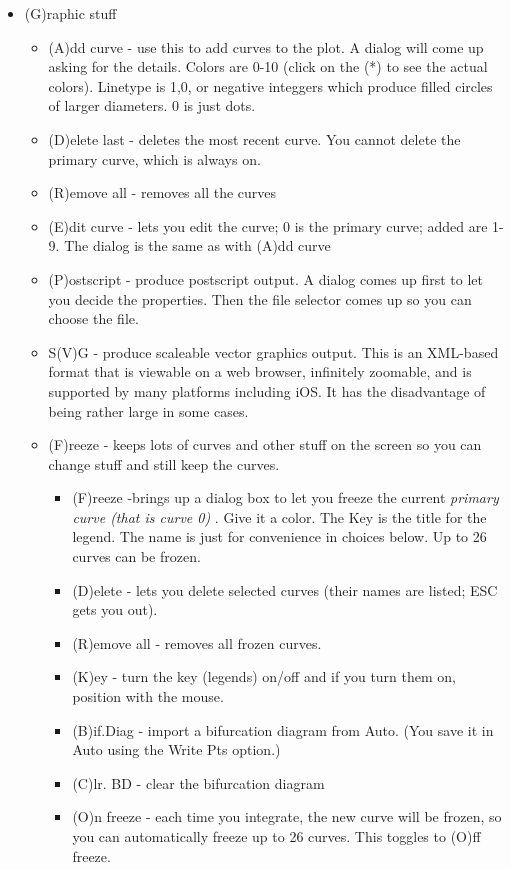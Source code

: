 \documentclass{article}
\begin{document}
\begin{itemize}
\begin{itemize}
\end{itemize}
\item (G)raphic stuff 
\begin{itemize}
\item (A)dd curve - use this to add curves to the plot. A dialog will come up asking for the details. Colors are 0-10 (click on the (*) to see the actual colors). Linetype is 1,0, or negative integgers which produce filled circles of larger diameters. 0 is just dots.
\item (D)elete last - deletes the most recent curve. You cannot delete the primary curve, which is always on.
\item (R)emove all - removes all the curves
\item (E)dit curve - lets you edit the curve; 0 is the primary curve; added are 1-9.  The dialog is the same as with (A)dd curve
\item (P)ostscript - produce postscript output. A dialog comes up first to let you decide the properties. Then the file selector comes up so you can choose the file. 
\item S(V)G - produce scaleable vector graphics output. This is an XML-based format that is viewable on a web browser, infinitely zoomable, and is supported by many platforms including iOS. It has the disadvantage of being rather large in some cases.
\item (F)reeze - keeps lots of curves and other stuff on the screen so you can change stuff and still keep the curves.
\begin{itemize} 
\item (F)reeze -brings up a dialog box to let you freeze the current {\em primary curve (that is curve 0)} . Give it a color. The Key is the title for the legend. The name is just for convenience in choices below.  Up to 26 curves can be frozen.
\item (D)elete - lets you delete selected curves (their names are listed; ESC gets you out).
\item (R)emove all - removes all frozen curves. 
\item (K)ey - turn the key (legends) on/off and if you turn them on, position with the mouse.
\item (B)if.Diag - import a bifurcation diagram from Auto. (You save it in Auto using the Write Pts option.)
\item (C)lr. BD - clear the bifurcation diagram
\item (O)n freeze - each time you integrate, the new curve will be frozen, so you can automatically freeze up to 26 curves. This toggles to (O)ff freeze.

\end{itemize}
\end{itemize}
\end{itemize}
\end{document}

